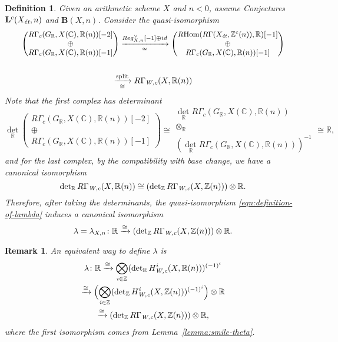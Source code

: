 \documentclass[10pt,a4paper,oneside,draft]{article}
\DeclareMathOperator{\Hom}{Hom}
\newcommand{\CC}{\mathbb{C}}
\newcommand{\RR}{\mathbb{R}}
\newcommand{\ZZ}{\mathbb{Z}}
\renewcommand{\det}{\operatorname{det}}
\newcommand{\et}{\text{\it \'{e}t}}
\newcommand{\Wc}{\text{\it W,c}}
\newcommand{\RHom}{R\!\Hom}
\theoremstyle{myplain}
\theoremstyle{mydefinition}
\newtheorem{definition}[theorem]{Definition}
\newtheorem{remark}[theorem]{Remark}
\numberwithin{equation}{section}
\begin{document}
\begin{definition}
  Given an arithmetic scheme $X$ and $n < 0$, assume
  Conjectures~$\mathbf{L}^c (X_\et, n)$ and $\mathbf{B} (X,n)$. Consider the
  quasi-isomorphism
  \begin{multline}\small
    \label{eqn:definition-of-lambda}
    \left(\!\!\!\begin{array}{c} R\Gamma_c (G_\RR, X (\CC), \RR (n)) [-2] \\ \oplus \\ R\Gamma_c (G_\RR, X (\CC), \RR (n)) [-1] \end{array}\!\!\!\right)
    \xrightarrow[\cong]{Reg_{X,n}^\vee [-1] \oplus id}
    \left(\!\!\!\begin{array}{c} \RHom (R\Gamma (X_\et, \ZZ^c (n)), \RR) [-1] \\ \oplus \\ R\Gamma_c (G_\RR, X (\CC), \RR (n)) [-1] \end{array}\!\!\!\right) \\
    \\
    \xrightarrow[\cong]{\text{split}} R\Gamma_\Wc (X, \RR (n))
  \end{multline}
  Note that the first complex has determinant
  \[ \det_\RR \left(\!\!\begin{array}{c} R\Gamma_c (G_\RR, X (\CC), \RR (n)) [-2] \\ \oplus \\ R\Gamma_c (G_\RR, X (\CC), \RR (n)) [-1] \end{array}\!\!\right) \cong
    \begin{array}{c} \det_\RR R\Gamma_c (G_\RR, X (\CC), \RR (n)) \\ \otimes_\RR \\ (\det_\RR R\Gamma_c (G_\RR, X (\CC), \RR (n)))^{-1} \end{array} \cong \RR, \]
  and for the last complex, by the compatibility with base change, we have a
  canonical isomorphism
  \[ \det_\RR R\Gamma_\Wc (X, \RR (n)) \cong
    (\det_\ZZ R\Gamma_\Wc (X, \ZZ (n))) \otimes \RR. \]
  Therefore, after taking the determinants, the quasi-isomorphism
  \eqref{eqn:definition-of-lambda} induces a canonical isomorphism
  \begin{equation}
    \label{eqn:morphism-lambda}
    \lambda = \lambda_{X,n}\colon \RR \xrightarrow{\cong}
    (\det_\ZZ R\Gamma_\Wc (X, \ZZ (n))) \otimes \RR.
  \end{equation}
\end{definition}

\begin{remark}
  An equivalent way to define $\lambda$ is
  \begin{multline*}
    \lambda\colon \RR \xrightarrow{\cong}
    \bigotimes_{i\in \ZZ} (\det_\RR H^i_\Wc (X, \RR (n)))^{(-1)^i} \\
    \xrightarrow{\cong} \Bigl(\bigotimes_{i\in \ZZ} (\det_\ZZ H^i_\Wc (X, \ZZ (n)))^{(-1)^i}\Bigr) \otimes \RR \\
    \xrightarrow{\cong} (\det_\ZZ R\Gamma_\Wc (X, \ZZ (n))) \otimes \RR,
  \end{multline*}
  where the first isomorphism comes from Lemma~\ref{lemma:smile-theta}.
\end{remark}
\end{document}
